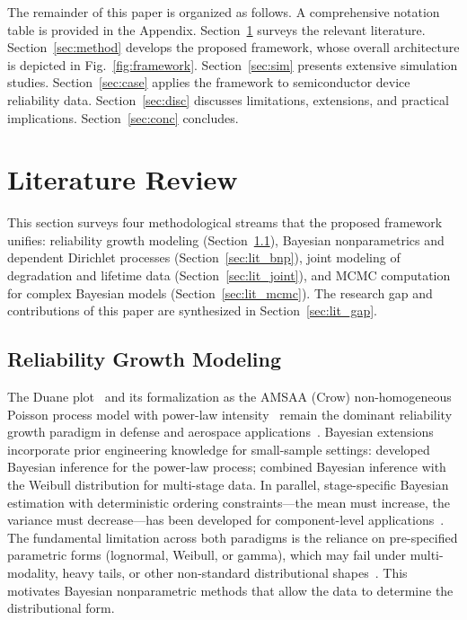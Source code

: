 \documentclass[a4paper,fleqn,longmktitle]{cas-sc}
\begin{document}
The remainder of this paper is organized as follows. A comprehensive notation table is provided in the Appendix. Section~\ref{sec:lit} surveys the relevant literature. Section~\ref{sec:method} develops the proposed framework, whose overall architecture is depicted in Fig.~\ref{fig:framework}. Section~\ref{sec:sim} presents extensive simulation studies. Section~\ref{sec:case} applies the framework to semiconductor device reliability data. Section~\ref{sec:disc} discusses limitations, extensions, and practical implications. Section~\ref{sec:conc} concludes.

\section{Literature Review}
\label{sec:lit}

This section surveys four methodological streams that the proposed framework unifies: reliability growth modeling (Section~\ref{sec:lit_growth}), Bayesian nonparametrics and dependent Dirichlet processes (Section~\ref{sec:lit_bnp}), joint modeling of degradation and lifetime data (Section~\ref{sec:lit_joint}), and MCMC computation for complex Bayesian models (Section~\ref{sec:lit_mcmc}). The research gap and contributions of this paper are synthesized in Section~\ref{sec:lit_gap}.

\subsection{Reliability Growth Modeling}
\label{sec:lit_growth}

The Duane plot~\cite{Duane1964} and its formalization as the AMSAA (Crow) non-homogeneous Poisson process model with power-law intensity~\cite{Crow1974,Crow1984} remain the dominant reliability growth paradigm in defense and aerospace applications~\cite{Hall1998,Crow2004,Donovan2025}. Bayesian extensions incorporate prior engineering knowledge for small-sample settings: \cite{Guida2001} developed Bayesian inference for the power-law process; \cite{Gholami2022} combined Bayesian inference with the Weibull distribution for multi-stage data. In parallel, stage-specific Bayesian estimation with deterministic ordering constraints---the mean must increase, the variance must decrease---has been developed for component-level applications~\cite{Liu2026a,Liu2026b}. The fundamental limitation across both paradigms is the reliance on pre-specified parametric forms (lognormal, Weibull, or gamma), which may fail under multi-modality, heavy tails, or other non-standard distributional shapes~\cite{Muller2004,Gelman2013}. This motivates Bayesian nonparametric methods that allow the data to determine the distributional form.
\end{document}
